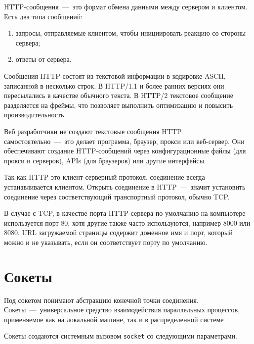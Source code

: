 HTTP-сообщения~---~это формат обмена данными между сервером и клиентом. Есть два типа сообщений:
\begin{enumerate}
	\item запросы, отправляемые клиентом, чтобы инициировать реакцию со стороны сервера;
	\item ответы от сервера.
\end{enumerate}

Сообщения HTTP состоят из текстовой информации в кодировке ASCII, записанной в несколько строк. В HTTP/1.1 и более ранних версиях они пересылались в качестве обычного текста. В HTTP/2 текстовое сообщение разделяется на фреймы, что позволяет выполнить оптимизацию и повысить производительность.

Веб разработчики не создают текстовые сообщения HTTP самостоятельно~---~это делает программа, браузер, прокси или веб-сервер. Они обеспечивают создание HTTP-сообщений через конфигурационные файлы (для прокси и серверов), APIs (для браузеров) или другие интерфейсы.

Так как HTTP это клиент-серверный протокол, соединение всегда устанавливается клиентом. Открыть соединение в HTTP~---~значит установить соединение через соответствующий транспортный протокол, обычно TCP.

В случае с TCP, в качестве порта HTTP-сервера по умолчанию на компьютере используется порт 80, хотя другие также часто используются, например 8000 или 8080. URL загружаемой страницы содержит доменное имя и порт, который можно и не указывать, если он соответствует порту по умолчанию.

\section{Сокеты}

Под сокетом понимают абстракцию конечной точки соединения. Сокеты~---~универсальное средство взаимодействия параллельных процессов, применяемое как на локальной машине, так и в распределенной системе~\cite{ryaznu}.

Сокеты создаются системным вызовом \texttt{socket} со следующими параметрами.

